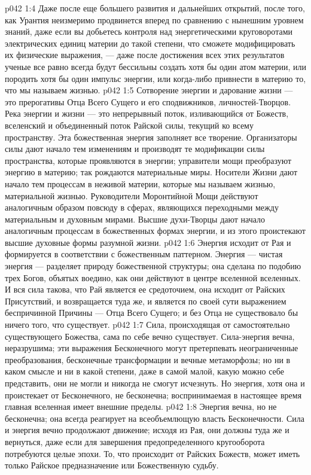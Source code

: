 \vs p042 1:4 Даже после еще большего развития и дальнейших открытий, после того, как Урантия неизмеримо продвинется вперед по сравнению с нынешним уровнем знаний, даже если вы добьетесь контроля над энергетическими круговоротами электрических единиц материи до такой степени, что сможете модифицировать их физические выражения, --- даже после достижения всех этих результатов ученые все равно всегда будут бессильны создать хотя бы один атом материи, или породить хотя бы один импульс энергии, или когда\hyp{}либо привнести в материю то, что мы называем жизнью.
\vs p042 1:5 \pc Сотворение энергии и дарование жизни --- это прерогативы Отца Всего Сущего и его сподвижников, личностей\hyp{}Творцов. Река энергии и жизни --- это непрерывный поток, изливающийся от Божеств, вселенский и объединенный поток Райской силы, текущий ко всему пространству. Эта божественная энергия заполняет все творение. Организаторы силы дают начало тем изменениям и производят те модификации силы пространства, которые проявляются в энергии; управители мощи преобразуют энергию в материю; так рождаются материальные миры. Носители Жизни дают начало тем процессам в неживой материи, которые мы называем жизнью, материальной жизнью. Руководители Моронтийной Мощи действуют аналогичным образом повсюду в сферах, являющихся переходными между материальным и духовным мирами. Высшие духи\hyp{}Творцы дают начало аналогичным процессам в божественных формах энергии, и из этого проистекают высшие духовные формы разумной жизни.
\vs p042 1:6 \pc Энергия исходит от Рая и формируется в соответствии с божественным паттерном. Энергия --- чистая энергия --- разделяет природу божественной структуры; она сделана по подобию трех Богов, объятых воедино, как они действуют в центре вселенной вселенных. И вся сила такова, что Рай является ее средоточием, она исходит от Райских Присутствий, и возвращается туда же, и является по своей сути выражением беспричинной Причины --- Отца Всего Сущего; и без Отца не существовало бы ничего того, что существует.
\vs p042 1:7 Сила, происходящая от самостоятельно существующего Божества, сама по себе вечно существует. Сила\hyp{}энергия вечна, неразрушима; эти выражения Бесконечного могут претерпевать неограниченные преобразования, бесконечные трансформации и вечные метаморфозы; но ни в каком смысле и ни в какой степени, даже в самой малой, какую можно себе представить, они не могли и никогда не смогут исчезнуть. Но энергия, хотя она и проистекает от Бесконечного, не бесконечна; воспринимаемая в настоящее время главная вселенная имеет внешние пределы.
\vs p042 1:8 Энергия вечна, но не бесконечна; она всегда реагирует на всеобъемлющую власть Бесконечности. Сила и энергия вечно продолжают движение; исходя из Рая, они должны туда же и вернуться, даже если для завершения предопределенного кругооборота потребуются целые эпохи. То, что происходит от Райских Божеств, может иметь только Райское предназначение или Божественную судьбу.
